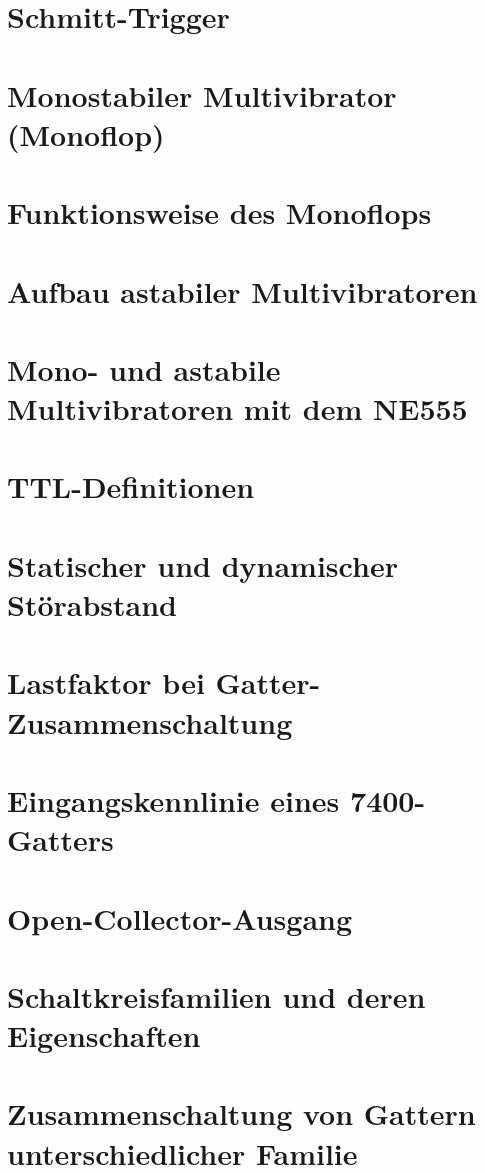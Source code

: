 \documentclass[a4paper, 11pt]{article}
\begin{document}
  
  \clearpage
  \setcounter{page}{1}

\section{Schmitt-Trigger}


\section{Monostabiler Multivibrator (Monoflop)}


\section{Funktionsweise des Monoflops}


\section{Aufbau astabiler Multivibratoren}

\section{Mono- und astabile Multivibratoren mit dem NE555}

\section{TTL-Definitionen}

\section{Statischer und dynamischer Störabstand}

\section{Lastfaktor bei Gatter-Zusammenschaltung}

\section{Eingangskennlinie eines 7400-Gatters}

\section{Open-Collector-Ausgang}

\section{Schaltkreisfamilien und deren Eigenschaften}

\section{Zusammenschaltung von Gattern unterschiedlicher Familie}
\end{document}
